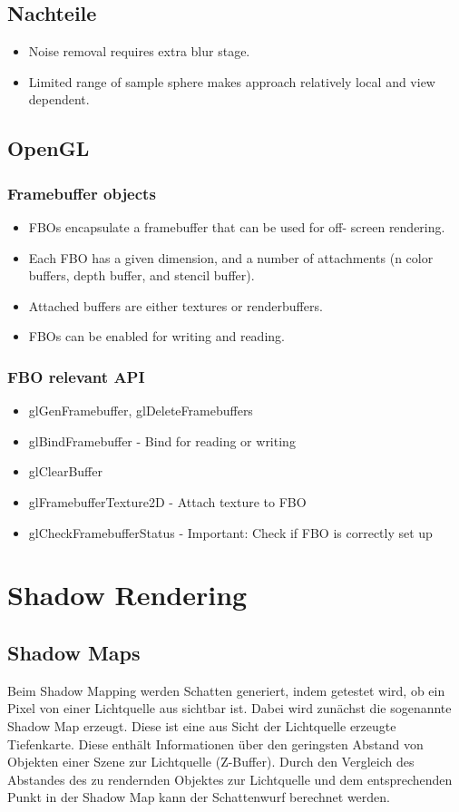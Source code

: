 \documentclass[10pt]{article}
\begin{document}
\subsection{Nachteile}
\begin{itemize}
	\item Noise removal requires extra blur stage.
	\item Limited range of sample sphere makes approach relatively local and view dependent.
\end{itemize}
\subsection{OpenGL}
\subsubsection{Framebuffer objects}
\begin{itemize}
	\item FBOs encapsulate a framebuffer that can be used for off- screen rendering.
	\item Each FBO has a given dimension, and a number of attachments (n color buffers, depth buffer, and stencil buffer).
	\item Attached buffers are either textures or renderbuffers. 
	\item FBOs can be enabled for writing and reading.
\end{itemize}
\subsubsection{FBO relevant API}
\begin{itemize}
	\item glGenFramebuffer, glDeleteFramebuffers
	\item glBindFramebuffer - Bind for reading or writing
	\item glClearBuffer
	\item glFramebufferTexture2D - Attach texture to FBO
	\item glCheckFramebufferStatus -  Important: Check if FBO is correctly set up
\end{itemize}

\newpage
\section{Shadow Rendering}
\subsection{Shadow Maps}
Beim Shadow Mapping werden Schatten generiert, indem getestet wird, ob ein Pixel von einer Lichtquelle aus sichtbar ist. Dabei wird zunächst die sogenannte Shadow Map erzeugt. Diese ist eine aus Sicht der Lichtquelle erzeugte Tiefenkarte. Diese enthält Informationen über den geringsten Abstand von Objekten einer Szene zur Lichtquelle (Z-Buffer). Durch den Vergleich des Abstandes des zu rendernden Objektes zur Lichtquelle und dem entsprechenden Punkt in der Shadow Map kann der Schattenwurf berechnet werden.
\end{document}
